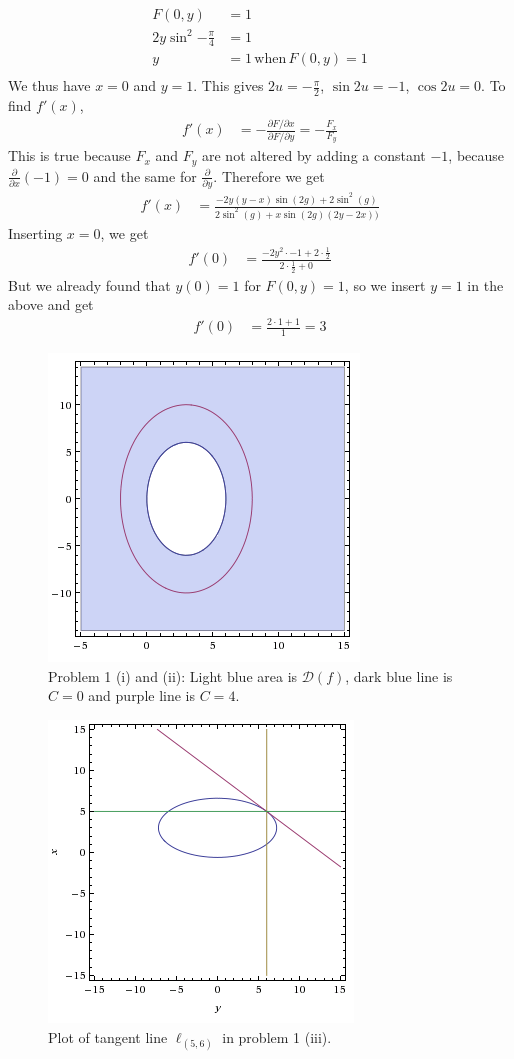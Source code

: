 \documentclass[a4paper,norsk,12pt]{article}
\begin{document}
\begin{align*}
  F(0,y) &= 1 \\
  2y\sin^2{-\frac{\pi}{4}} &= 1\\
  y &= 1 \,\text{when}\, F(0,y)=1\\
\end{align*}
We thus have $x=0$ and $y=1$. This gives $2u = -\frac{\pi}{2}$, $\sin{2u} =
-1$, $\cos{2u} = 0$. To find $f'(x)$,
\begin{align*}
  f'(x) &= -\frac{\partial F / \partial x}{\partial F / \partial y}
  = -\frac{F_x}{F_y}
\end{align*}
This is true because $F_x$ and $F_y$ are not altered by adding a constant $-1$,
because $\frac{\partial}{\partial x}\left(-1\right) = 0$ and the same for
$\frac{\partial}{\partial y}$. Therefore we get
\begin{align*}
  f'(x) &= \frac{
      -2y(y-x)\sin{(2g)}+2\sin^2{(g)}
    } {
      2\sin^2{(g)}+x\sin{(2g)}(2y-2x))
    }
\end{align*}
Inserting $x=0$, we get
\begin{align*}
  f'(0) &= \frac{-2y^2\cdot-1 + 2\cdot\frac{1}{2}}{2\cdot\frac{1}{2}+0}
\end{align*}
But we already found that $y(0)=1$ for $F(0,y)=1$, so we insert $y=1$ in the
above and get
\begin{align*}
  f'(0) &= \frac{2\cdot1 + 1}{1} = 3
\end{align*}

\begin{figure}[h]
  \centering
  \includegraphics{ob1plot2.png}
  \caption{Problem 1 (i) and (ii): Light blue area is $\mathcal{D}(f)$,
           dark blue line is $C=0$ and purple line is $C=4$.}
  \label{plot.p2}
  \label{plot.p1}
\end{figure}

\begin{figure}[h]
  \centering
  \includegraphics{ob1plot3.png}
  \caption{Plot of tangent line $\ell_{(5,6)}$ in problem 1 (iii).}
  \label{plot.p3}
\end{figure}
\end{document}
